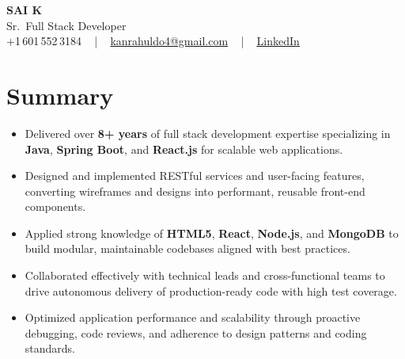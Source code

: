 \documentclass[letterpaper,11pt]{article}
\newcommand{\resumeItem}[1]{
  \item\footnotesize{
    {#1 \vspace{-2pt}}
  }
}
\newcommand{\resumeItemListStart}{\begin{itemize}[leftmargin=*]}
\newcommand{\resumeItemListEnd}{\end{itemize}\vspace{-5pt}}
\begin{document}
\begin{center}
    {\fontsize{14pt}{12pt}\selectfont \textbf{\MakeUppercase{Sai K}}}\\ \vspace{2pt}
    \fontsize{10pt}{12pt}\selectfont Sr.\ Full Stack Developer\\ \vspace{2pt}
    \fontsize{10pt}{12pt}\selectfont +1\,601\,552\,3184 ~ | ~
    \href{mailto:kanrahuldo4@gmail.com}{kanrahuldo4@gmail.com} ~ | ~
    \href{https://www.linkedin.com/in/srrrk/}{\color{blue}\underline{LinkedIn}}
    \vspace{-10pt}
\end{center}

\section{Summary}
\fontsize{9pt}{10pt}\selectfont
\resumeItemListStart
  \resumeItem{Delivered over \textbf{8+ years} of full stack development expertise specializing in \textbf{Java}, \textbf{Spring Boot}, and \textbf{React.js} for scalable web applications.}
  \resumeItem{Designed and implemented RESTful services and user-facing features, converting wireframes and designs into performant, reusable front-end components.}
  \resumeItem{Applied strong knowledge of \textbf{HTML5}, \textbf{React}, \textbf{Node.js}, and \textbf{MongoDB} to build modular, maintainable codebases aligned with best practices.}
  \resumeItem{Collaborated effectively with technical leads and cross-functional teams to drive autonomous delivery of production-ready code with high test coverage.}
  \resumeItem{Optimized application performance and scalability through proactive debugging, code reviews, and adherence to design patterns and coding standards.}
\resumeItemListEnd
\vspace{-6pt}

\end{document}
